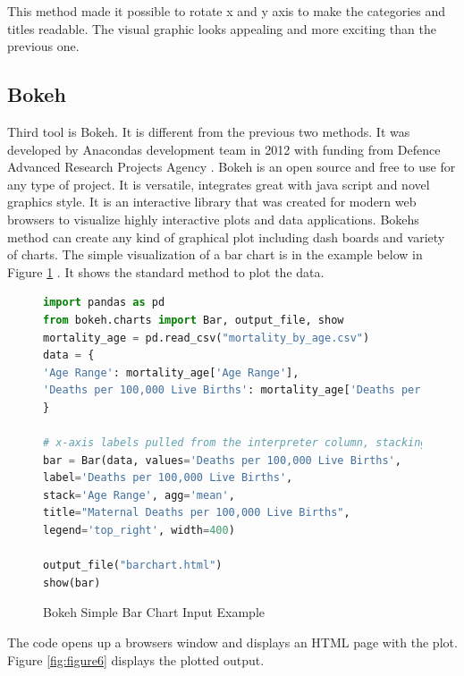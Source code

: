 \documentclass[sigconf]{acmart}
\begin{document}
This method made it possible to rotate x and y axis to make the categories and titles readable. The visual graphic looks appealing and more exciting than the previous one.


\subsection{Bokeh}

Third tool is Bokeh. It is different from the previous two methods. It was developed by Anaconda\textquotesingle s development team in 2012 with funding from Defence Advanced Research Projects Agency \cite{bk}. Bokeh is an open source and free to use for any type of project. It is versatile, integrates great with java script and novel graphics style. It is an interactive library that was created for modern web browsers to visualize highly interactive plots and data applications. Bokeh\textquotesingle s method can create any kind of graphical plot including dash boards and variety of charts. The simple visualization of a bar chart is in the example below in Figure \ref{fig:figure5} \cite{md}. It shows the standard method to plot the data.

\begin{figure}
\begin{lstlisting}[language=Python]
import pandas as pd
from bokeh.charts import Bar, output_file, show
mortality_age = pd.read_csv("mortality_by_age.csv")
data = {
'Age Range': mortality_age['Age Range'],
'Deaths per 100,000 Live Births': mortality_age['Deaths per 100,000 Live Births:']
}

# x-axis labels pulled from the interpreter column, stacking labels from sample column
bar = Bar(data, values='Deaths per 100,000 Live Births',
label='Deaths per 100,000 Live Births',
stack='Age Range', agg='mean',
title="Maternal Deaths per 100,000 Live Births",
legend='top_right', width=400)

output_file("barchart.html")
show(bar)
\end{lstlisting}
\caption{Bokeh Simple Bar Chart Input Example \cite{md}}
\label{fig:figure5}
\end{figure}

The code opens up a browser\textquotesingle s window and displays an HTML page with the plot. Figure \ref{fig:figure6} displays the plotted output. 
\end{document}
